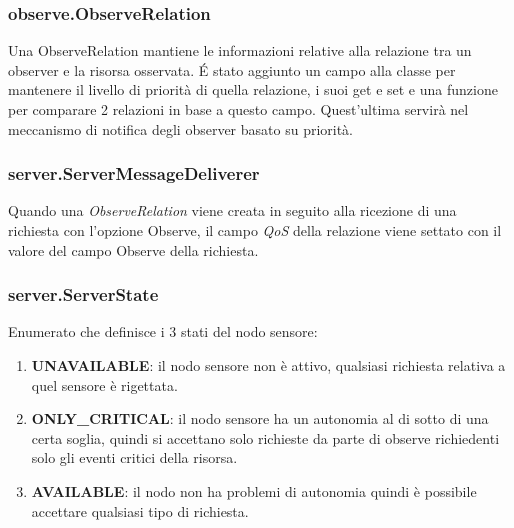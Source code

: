 			\subsubsection{observe.ObserveRelation}
			Una ObserveRelation mantiene le informazioni relative alla relazione tra un observer e la risorsa osservata. \'E stato aggiunto un 	campo alla classe per mantenere il livello di priorità di quella relazione, i suoi get e set e una funzione per comparare 2 relazioni in base a questo campo. Quest'ultima servirà nel meccanismo di notifica degli observer basato su priorità. \newline
				
				

			\subsubsection{server.ServerMessageDeliverer}
				Quando una \textit{ObserveRelation} viene creata in seguito alla ricezione di una richiesta con l’opzione Observe, il campo \textit{QoS} della relazione viene settato con il valore del campo Observe della richiesta. \newline
				

			\subsubsection{server.ServerState}
				Enumerato che definisce i 3 stati del nodo sensore:
				\begin{enumerate}
					\item \textbf{UNAVAILABLE}: il nodo sensore non è attivo, qualsiasi richiesta relativa a quel sensore è rigettata.
					\item \textbf{ONLY\_CRITICAL}: il nodo sensore ha un autonomia al di sotto di una certa soglia, quindi si accettano solo richieste da parte di observe richiedenti solo gli eventi critici della risorsa.
					\item \textbf{AVAILABLE}: il nodo non ha problemi di autonomia quindi è possibile accettare qualsiasi tipo di richiesta.
				\end{enumerate}
				

